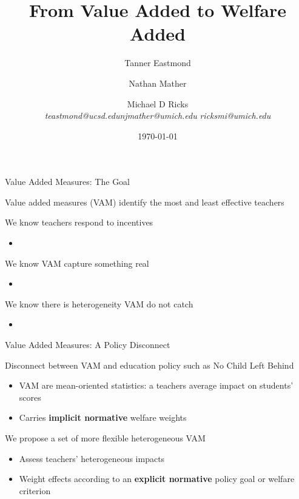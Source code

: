 \documentclass[t,aspectratio=169,11pt]{beamer}
\title{From Value Added to Welfare Added}
\author{Tanner Eastmond \hfill \and Nathan Mather   \and \hfill Michael D Ricks   \\   \textit{teastmond@ucsd.edu}\hfill \textit{njmather{\fontfamily{qag}\selectfont @}umich.edu} \hfill
\textit{ricksmi{\fontfamily{qag}\selectfont @}umich.edu} }
\institute{}
\date{\today}
\newenvironment{wideitemize}{\itemize\addtolength{\itemsep}{14pt}}{\enditemize}
\begin{document}
\begin{frame}
\titlepage 
\end{frame}

\begin{frame}{Value Added Measures: The Goal}
\begin{wideitemize}
    \item Value added measures (VAM) identify the most and least effective teachers
    \item We know teachers respond to incentives
    \begin{itemize}
        \item {}
    \end{itemize}
    \item We know VAM capture something real
    \begin{itemize}
        \item {}
    \end{itemize}
    \item We know there is heterogeneity VAM do not catch
    \begin{itemize}
        \item {}
    \end{itemize}
\end{wideitemize}

\end{frame}

\begin{frame}{Value Added Measures: A Policy Disconnect  }
\begin{wideitemize}

    \item Disconnect between VAM and education policy such as No Child Left Behind
    \begin{itemize}
        \item VAM are mean-oriented statistics: a teachers average impact on students' scores
        \item Carries \textbf{implicit normative} welfare weights 
    \end{itemize}
    
    \item  We propose a set of more flexible heterogeneous VAM 
    \begin{itemize}
        \item Assess teachers' heterogeneous impacts
        \item  Weight effects according to an \textbf{explicit normative} policy goal or welfare criterion
    \end{itemize}


\end{wideitemize}

\end{frame}
\end{document}
